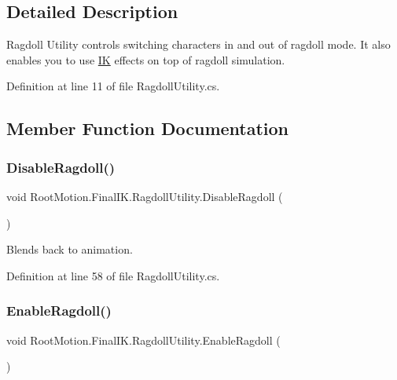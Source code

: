 \subsection{Detailed Description}
Ragdoll Utility controls switching characters in and out of ragdoll mode. It also enables you to use \mbox{\hyperlink{class_root_motion_1_1_final_i_k_1_1_i_k}{IK}} effects on top of ragdoll simulation. 



Definition at line 11 of file Ragdoll\+Utility.\+cs.



\subsection{Member Function Documentation}
\mbox{\label{class_root_motion_1_1_final_i_k_1_1_ragdoll_utility_a47ed207d4dcd8fcd87da1c2b4688a439}} 
\subsubsection{\texorpdfstring{Disable\+Ragdoll()}{DisableRagdoll()}}
{\footnotesize\ttfamily void Root\+Motion.\+Final\+I\+K.\+Ragdoll\+Utility.\+Disable\+Ragdoll (\begin{DoxyParamCaption}{ }\end{DoxyParamCaption})}



Blends back to animation. 



Definition at line 58 of file Ragdoll\+Utility.\+cs.

\mbox{\label{class_root_motion_1_1_final_i_k_1_1_ragdoll_utility_a178bb74ed5c6075d3bcbfe10cbd62b30}} 
\subsubsection{\texorpdfstring{Enable\+Ragdoll()}{EnableRagdoll()}}
{\footnotesize\ttfamily void Root\+Motion.\+Final\+I\+K.\+Ragdoll\+Utility.\+Enable\+Ragdoll (\begin{DoxyParamCaption}{ }\end{DoxyParamCaption})}



